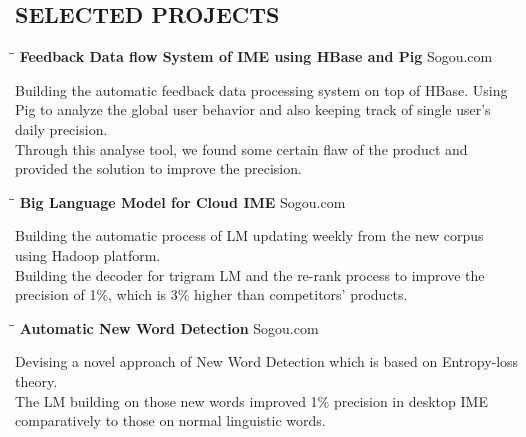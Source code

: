 \documentclass{res}
\begin{document}
\begin{resume}
\section{SELECTED PROJECTS}
   \vspace{-0.1in}	
   \begin{tabbing}
   \hspace{2.3in}\= \hspace{2.6in}\= \kill %
    {\bf Feedback Data flow System of IME using HBase and Pig}\> \>Sogou.com     \\
   \end{tabbing}\vspace{-20pt}      %
   Building the automatic feedback data processing system on top of HBase. Using Pig to analyze the global user behavior and also keeping track of single user's daily precision. \\
   Through this analyse tool, we found some certain flaw of the product and provided the solution to improve the precision.
   \begin{tabbing}
   \hspace{2.3in}\= \hspace{2.6in}\= \kill %
    {\bf Big Language Model for Cloud IME} \> \>Sogou.com     \\
   \end{tabbing}\vspace{-20pt}      %
   Building the automatic process of LM updating weekly from the new corpus using Hadoop platform. \\
   Building the decoder for trigram LM and the re-rank process to improve the precision of 1\%, which is 3\% higher than competitors' products.
   \begin{tabbing}
   \hspace{2.3in}\= \hspace{2.6in}\= \kill %
    {\bf Automatic New Word Detection}\> \>Sogou.com     \\
   \end{tabbing}\vspace{-20pt}      %
   Devising a novel approach of New Word Detection which is based on Entropy-loss theory.\\
   The LM building on those new words improved 1\% precision in desktop IME comparatively to those on normal linguistic words.
   \begin{tabbing}

\end{tabbing}
\end{resume}
\end{document}
